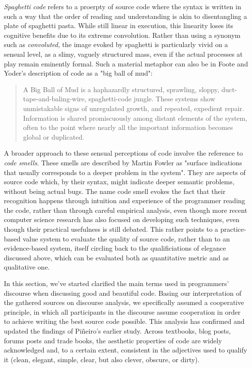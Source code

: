 \emph{Spaghetti code} refers to a proerpty of source code where the syntax is written in such a way that the order of reading and understanding is akin to disentangling a plate of spaghetti pasta. While still linear in execution, this linearity loses its cognitive benefits due to its extreme convolution. Rather than using a synonym such as \emph{convoluted}, the image evoked by spaghetti is particularly vivid on a sensual level, as a slimy, vaguely structured mass, even if the actual processes at play remain eminently formal\cite{steele_macaroni_1977}. Such a material metaphor can also be in Foote and Yoder's description of code as a "big ball of mud":

\begin{quote}
  A Big Ball of Mud is a haphazardly structured, sprawling, sloppy, duct-tape-and-baling-wire, spaghetti-code jungle. These systems show unmistakable signs of unregulated growth, and repeated, expedient repair. Information is shared promiscuously among distant elements of the system, often to the point where nearly all the important information becomes global or duplicated.\cite{foote_big_1997}
\end{quote}

A broader approach to these sensual perceptions of code involve the reference to \emph{code smells}. These smells are described by Martin Fowler as "surface indications that usually corresponds to a deeper problem in the system"\cite{fowler_refactoring_1999}. They are aspects of source code which, by their syntax, might indicate deeper semantic problems, without being actual bugs. The name code smell evokes the fact that their recognition happens through intuition and experience of the programmer reading the code, rather than through careful empirical analysis, even though more recent computer science research has also focused on developing such techniques\cite{rasool_review_2015}, even though their practical usefulness is still debated\cite{santos_systematic_2018}. This rather points to a practice-based value system to evaluate the quality of source code, rather than to an evidence-based system, itself circling back to the qualificiations of elegance discussed above, which can be evaluated both as quantitative metric and as qualitative one.

\vspace*{1\baselineskip}

In this section, we've started clarified the main terms used in programmers' discourse when discussing good and beautiful code. Basing our interpretation of the gathered sources on discourse analysis, we specifically assumed a cooperative principle, in which all participants in the discourse assume cooperation in order to achieve writing the best source code possible. This analysis has confirmed and updated the findings of Piñeiro's earlier study. Across textbooks, blog posts, forums posts and trade books, the aesthetic properties of code are widely acknowledged and, to a certain extent, consistent in the adjectives used to qualify it (clean, elegant, simple, clear, but also clever, obscure, or dirty).

